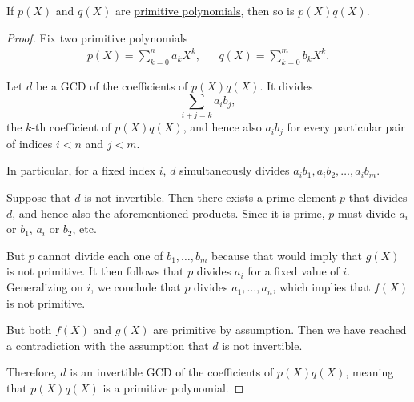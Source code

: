 \begin{lemma}\label{thm:gauss_lemma}
  If \( p(X) \) and \( q(X) \) are \hyperref[def:domain_primitive_polynomial]{primitive polynomials}, then so is \( p(X) q(X) \).
\end{lemma}
\begin{proof}
  Fix two primitive polynomials
  \begin{align*}
    p(X) = \sum_{k=0}^n a_k X^k,
    &&
    q(X) = \sum_{k=0}^m b_k X^k.
  \end{align*}

  Let \( d \) be a GCD of the coefficients of \( p(X) q(X) \). It divides
  \begin{equation*}
    \sum_{i+j=k} a_i b_j,
  \end{equation*}
  the \( k \)-th coefficient of \( p(X) q(X) \), and hence also \( a_i b_j \) for every particular pair of indices \( i < n \) and \( j < m \).

  In particular, for a fixed index \( i \), \( d \) simultaneously divides \( a_i b_1, a_i b_2, \ldots, a_i b_m \).

  Suppose that \( d \) is not invertible. Then there exists a prime element \( p \) that divides \( d \), and hence also the aforementioned products. Since it is prime, \( p \) must divide \( a_i \) or \( b_1 \), \( a_i \) or \( b_2 \), etc.

  But \( p \) cannot divide each one of \( b_1, \ldots, b_m \) because that would imply that \( g(X) \) is not primitive. It then follows that \( p \) divides \( a_i \) for a fixed value of \( i \). Generalizing on \( i \), we conclude that \( p \) divides \( a_1, \ldots, a_n \), which implies that \( f(X) \) is not primitive.

  But both \( f(X) \) and \( g(X) \) are primitive by assumption. Then we have reached a contradiction with the assumption that \( d \) is not invertible.

  Therefore, \( d \) is an invertible GCD of the coefficients of \( p(X) q(X) \), meaning that \( p(X) q(X) \) is a primitive polynomial.
\end{proof}

